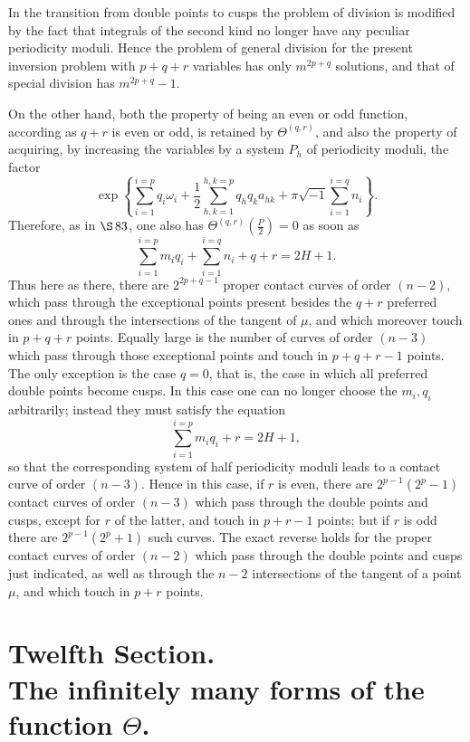 \documentclass[10pt]{article}
\begin{document}
In the transition from double points to cusps the problem of division is modified by the fact that integrals of the second kind no longer have any peculiar periodicity moduli. Hence the problem of general division for the present inversion problem with \(p+q+r\) variables has only \(m^{2p+q}\) solutions, and that of special division has \(m^{2p+q}-1\).

On the other hand, both the property of being an even or odd function, according as \(q+r\) is even or odd, is retained by \(\Theta^{(q,r)}\), and also the property of acquiring, by increasing the variables by a system \(P_h\) of periodicity moduli, the factor
\[
\exp\!\left\{\sum_{i=1}^{i=p}q_i\omega_i
+\frac12\sum_{h,k=1}^{h,k=p}q_hq_ka_{hk}
+\pi\sqrt{-1}\sum_{i=1}^{i=q}n_i\right\}.
\]
Therefore, as in \(\S\,83\), one also has \(\Theta^{(q,r)}\left(\frac P2\right)=0\) as soon as
\[
\sum_{i=1}^{i=p}m_iq_i+\sum_{i=1}^{i=q}n_i+q+r=2H+1.
\]
Thus here as there, there are \(2^{2p+q-1}\) proper contact curves of order \((n-2)\), which pass through the exceptional points present besides the \(q+r\) preferred ones and through the intersections of the tangent of \(\mu\), and which moreover touch in \(p+q+r\) points. Equally large is the number of curves of order \((n-3)\) which pass through those exceptional points and touch in \(p+q+r-1\) points. The only exception is the case \(q=0\), that is, the case in which all preferred double points become cusps. In this case one can no longer choose the \(m_i,q_i\) arbitrarily; instead they must satisfy the equation
\[
\sum_{i=1}^{i=p}m_iq_i+r=2H+1,
\]
so that the corresponding system of half periodicity moduli leads to a contact curve of order \((n-3)\). Hence in this case, if \(r\) is even, there are \(2^{p-1}(2^p-1)\) contact curves of order \((n-3)\) which pass through the double points and cusps, except for \(r\) of the latter, and touch in \(p+r-1\) points; but if \(r\) is odd there are \(2^{p-1}(2^p+1)\) such curves. The exact reverse holds for the proper contact curves of order \((n-2)\) which pass through the double points and cusps just indicated, as well as through the \(n-2\) intersections of the tangent of a point \(\mu\), and which touch in \(p+r\) points.



\section*{Twelfth Section.\\The infinitely many forms of the function \(\Theta\).}
\end{document}
